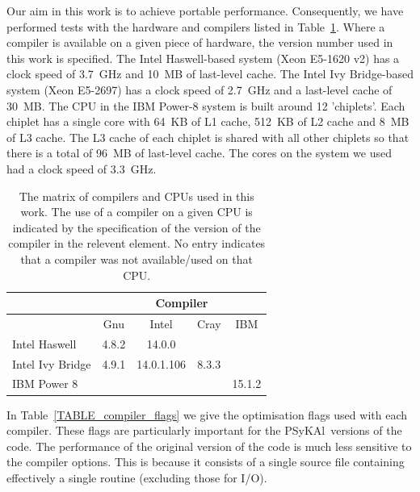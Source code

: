 \documentclass[journal]{IEEEtran}
\newcommand{\psykal}{{PS}y{KA}l\ }
\begin{document}
Our aim in this work is to achieve portable performance. Consequently,
we have performed tests with the hardware and compilers listed in
Table~\ref{TABLE_compilers}. Where a compiler is available on a given
piece of hardware, the version number used in this work is specified.
The Intel Haswell-based system (Xeon E5-1620 v2) has a clock speed of
3.7~GHz and 10~MB of last-level cache. The Intel Ivy Bridge-based
system (Xeon E5-2697) has a clock speed of 2.7~GHz and a last-level
cache of 30~MB. The CPU in the IBM Power-8 system is built around 12
'chiplets'. Each chiplet has a single core with 64~KB of L1 cache,
512~KB of L2 cache and 8~MB of L3 cache. The L3 cache of each chiplet
is shared with all other chiplets so that there is a total of 96~MB of
last-level cache. The cores on the system we used had a clock speed of
3.3~GHz.

\begin{table}[!t]
\renewcommand{\arraystretch}{1.3}
\caption{The matrix of compilers and CPUs used in this work. The use
  of a compiler on a given CPU is indicated by the specification of
  the version of the compiler in the relevent element. No entry
  indicates that a compiler was not available/used on that CPU.}
\label{TABLE_compilers}
\centering
\begin{tabular}{|l|c|c|c|c|}
\hline
                 & \multicolumn{4}{c|}{Compiler}             \\
\hline
                 & Gnu   & Intel       & Cray    & IBM     \\
\hline
Intel Haswell    & 4.8.2 & 14.0.0      &         &          \\
Intel Ivy Bridge & 4.9.1 & 14.0.1.106  & 8.3.3   &          \\
IBM Power 8      &       &             &         & 15.1.2     \\
\hline
\end{tabular}
\end{table}

In Table~\ref{TABLE_compiler_flags} we give the optimisation flags
used with each compiler. These flags are particularly important for
the \psykal versions of the code. The performance of the original
version of the code is much less sensitive to the compiler
options. This is because it consists of a single source file
containing effectively a single routine (excluding those for I/O).
 
\end{document}
